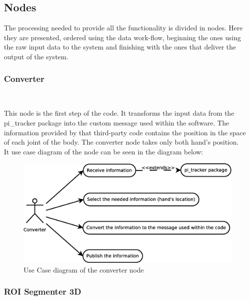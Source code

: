 \subsection{Nodes}
\label{nodes}


The processing needed to provide all the functionality is divided in nodes. Here they are presented, ordered using the data work-flow, beginning the ones using the raw input data to the system and finishing with the ones that deliver the output of the system. 
\\


\subsubsection{\large Converter}\\
		\label{converter}

	This node is the first step of the code. It transforms the input data from the pi\_tracker package into the custom message used within the software. The information provided by that third-party code contains the position in the space of each joint of the body. The converter node takes only both hand's position. 
	\\

	It use case diagram of the node can be seen in the diagram below: 

	\begin{figure}[H]
		\centering
	\includegraphics[scale=0.4]{img/diagrams/uc_converter.eps}
		\caption[Use case diagram converter node]{Use Case diagram of the converter node}
		
	\end{figure}

	
\subsubsection{ROI Segmenter 3D}\\
	\label{roi_segmenter_3d}

